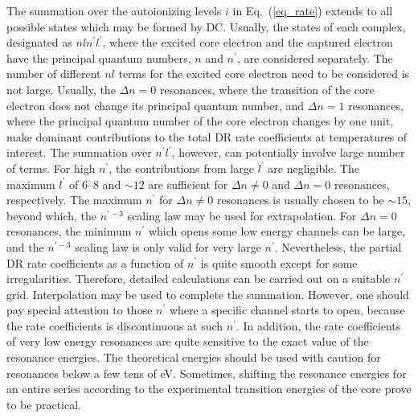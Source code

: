 The summation over the autoionizing levels $i$ in Eq.~(\ref{eq_rate})
extends to all possible states which may be formed by DC. Usually, the states
of each 
complex, designated as $nln^\prime l^\prime$, where the excited core electron
and the captured electron have the principal quantum numbers, $n$ and
$n^\prime$, are considered separately. 
The number of different $nl$ terms for the excited core
electron need to be considered is not large. Usually, the $\Delta n = 0$
resonances, where the transition of the core electron does not change its
principal quantum number, and $\Delta n = 1$ resonances, where the principal
quantum number of the core electron changes by one unit, make
dominant contributions to the 
total DR rate coefficients at temperatures of interest. The summation
over $n^\prime l^\prime$, however, can potentially involve large number of
terms. For high $n^\prime$, the contributions from large $l^\prime$ are
negligible. The maximum $l^\prime$ of 6--8 and $\sim 12$ are sufficient for
$\Delta n \ne 0$ and $\Delta n = 0$ resonances, respectively. The maximum
$n^\prime$ for $\Delta n \ne 0$ resonances is usually chosen to be $\sim 15$,
beyond which, the $n^{\prime -3}$ scaling law may be used for
extrapolation. For $\Delta n = 0$ resonances, the minimum $n^\prime$ which
opens some low energy channels can be large, and the $n^{\prime -3}$ scaling
law is only valid for very large $n^\prime$. Nevertheless, the partial DR rate
coefficients as a function of $n^\prime$ is quite smooth except for some
irregularities. Therefore, detailed 
calculations can be carried out on a suitable $n^\prime$ grid.
Interpolation may be used to complete the summation. However, one should pay
special attention to those $n^\prime$ where a specific channel starts to
open, because the rate coefficients is discontinuous at such $n^\prime$. In
addition, the rate coefficients of very low energy resonances are quite
sensitive to the exact value of the resonance energies. The theoretical
energies should be used with caution for resonances below a few tens of
eV. Sometimes, shifting the resonance energies for an entire series according
to the experimental transition energies of the core prove to be practical.
